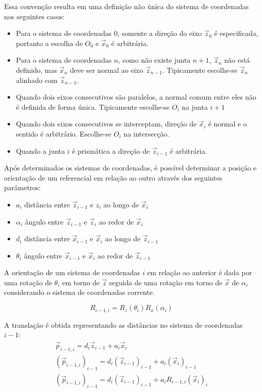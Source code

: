 Essa convenção resulta em uma definição não única do sistema de coordenadas nos seguintes casos:

\begin{itemize}
\item Para o sistema de coordenadas $0$, somente a direção do eixo $\vec{z}_0$ é especificada, portanto a escolha de $O_0$ e $ \vec{x}_0$ é arbitrária.
\item Para o sistema de coordenadas $n$, como não existe junta $n+1$, $\vec{z}_n$ não está definido, mas $\vec{x}_n$ deve ser normal ao eixo $\vec{z}_{n-1}$. Tipicamente escolhe-se $\vec{z}_n$ alinhado com $\vec{z}_{n-1}$.
\item Quando dois eixos consecutivos são paralelos, a normal comum entre eles não é definida de forma única. Tipicamente escolhe-se $O_i$ na junta $i+1$
\item  Quando dois eixos consecutivos se interceptam, direção de $\vec{x}_i$ é normal e o sentido é arbitrário. Escolhe-se $O_i$ na intersecção.
\item Quando a junta $i$ é prismática a direção de $\vec{z}_{i-1}$ é arbitrária.
\end{itemize}

Após determinados os sistemas de coordenadas, é possível determinar a posição e orientação de um referencial em relação ao outro através dos seguintes parâmetros:
\begin{itemize}
\item $a_i$ distância entre $\vec{z}_{i-1}$ e $z_i$ ao longo de $\vec{x}_i$
\item $\alpha_i$ ângulo entre $\vec{z}_{i-1}$ e $\vec{z}_i$ ao redor de $\vec{x}_i$
\item $d_i$ distância entre $\vec{x}_{i-1}$ e $\vec{x}_i$ ao longo de $\vec{z}_{i-1}$
\item $\theta_i$ ângulo entre $\vec{x}_{i-1}$ e $\vec{x}_i$ ao redor de $\vec{z}_{i-1}$
\end{itemize}

A orientação de um sistema de coordenadas $i$ em relação ao anterior é dada por uma rotação de $\theta_i$ em torno de $\vec{z}$ seguida de uma rotação em torno de $\vec{x}$ de $\alpha_i$ considerando o sistema de coordenadas corrente.

\begin{equation}
{R}_{i-1,i} = {R}_z(\theta_i){R}_x(\alpha_i)
\end{equation}

A translação é obtida representando as distâncias no sistema de coordenadas $i-1$:
\begin{gather}
{\vec{p}}_{i-1,i} = d_i {\vec{z}}_{i-1} + a_i {\vec{x}}_i \\
({\vec{p}}_{i-1,i})_{i-1} = d_i ({\vec{z}}_{i-1})_{i-1} + a_i ({\vec{x}}_i)_{i-1} \\
({\vec{p}}_{i-1,i})_{i-1} = d_i ({\vec{z}}_{i-1})_{i-1} + a_i {R}_{i-1,i}({\vec{x}}_i)_{i} 
\end{gather}

